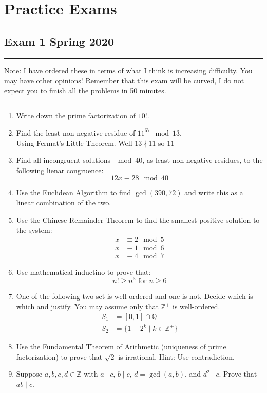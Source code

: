 \documentclass[class=article, crop=false]{standalone}
\def\integers{{\mathbb Z}}
\def\rationals{{\mathbb Q}}
\begin{document}
\section{Practice Exams}

\subsection{Exam 1 Spring 2020}
\rule{\textwidth}{1pt}
Note: I have ordered these in terms of what I think is increasing difficulty.
You may have other opinions! Remember that this exam will be curved, I do not expect
you to finish all the problems in 50 minutes.\\
\rule{\textwidth}{1pt}
\begin{enumerate}[1.]
	\item Write down the prime factorization of $10!$.
	
	\item Find the least non-negative residue of $11^{67} \mod 13$. \\
	Using Fermat's Little Theorem. Well $13\nmid 11$ so $11^{}$
	
	\item Find all incongruent solutions $\mod 40$, as least non-negative residues,
	to the following lienar congruence: $$12x\equiv 28\mod 40$$

	\item Use the Euclidean Algorithm to find $\gcd (390,72)$ and write this as a linear
	combination of the two.

	\item Use the Chinese Remainder Theorem to find the smallest positive solution to the
	system:
	\begin{align*}
		x &\equiv 2\mod 5 \\
		x &\equiv 1\mod 6 \\
		x &\equiv 4\mod 7
	\end{align*}

	\item Use mathematical inductino to prove that: $$n!\geq n^3 \text{ for } n\geq 6$$
	
	\item One of the following two set is well-ordered and one is not. Decide which is which
	and justify. You may assume only that $\integers^+$ is well-ordered.
	\begin{align*}
		S_1 &= [0,1]\cap \rationals \\
		S_2 &= \{1-2^k \mid k\in\integers^+ \}
	\end{align*}

	\item Use the Fundamental Theorem of Arithmetic (uniqueness of prime factorization) to prove
	that $\sqrt{2}$ is irrational. Hint: Use contradiction.

	\item Suppose $a,b,c,d\in\integers$ with $a\mid c$, $b\mid c$, $d=\gcd(a,b)$, and $d^2\mid c$.
	Prove that $ab\mid c$.

\end{enumerate}
\end{document}
